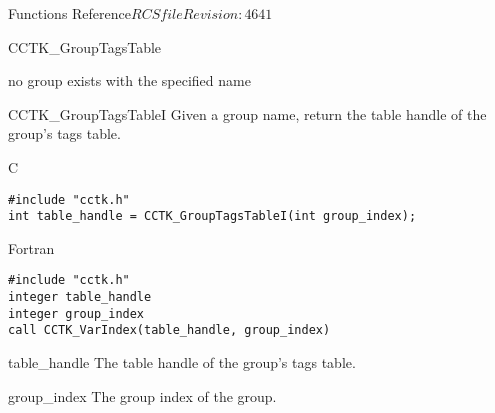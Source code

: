 \begin{cactuspart}{ Functions Reference}{$RCSfile$}{$Revision: 4641 $}
\begin{FunctionDescription}{CCTK\_GroupTagsTable}
\begin{ErrorSection}
\begin{Error}{-1}
no group exists with the specified name
\end{Error}
\end{ErrorSection}
\end{FunctionDescription}




\begin{FunctionDescription}{CCTK\_GroupTagsTableI}
\label{CCTK-GroupTagsTableI}
Given a group name, return the table handle of the group's tags table.

\begin{SynopsisSection}
\begin{Synopsis}{C}
\begin{verbatim}
#include "cctk.h"
int table_handle = CCTK_GroupTagsTableI(int group_index);
\end{verbatim}
\end{Synopsis}
\begin{Synopsis}{Fortran}
\begin{verbatim}
#include "cctk.h"
integer table_handle
integer group_index
call CCTK_VarIndex(table_handle, group_index)
\end{verbatim}
\end{Synopsis}
\end{SynopsisSection}

\begin{ResultSection}
\begin{Result}{table\_handle}
The table handle of the group's tags table.
\end{Result}
\end{ResultSection}

\begin{ParameterSection}
\begin{Parameter}{group\_index}
The group index of the group.
\end{Parameter}
\end{ParameterSection}


\end{FunctionDescription}
\end{cactuspart}
